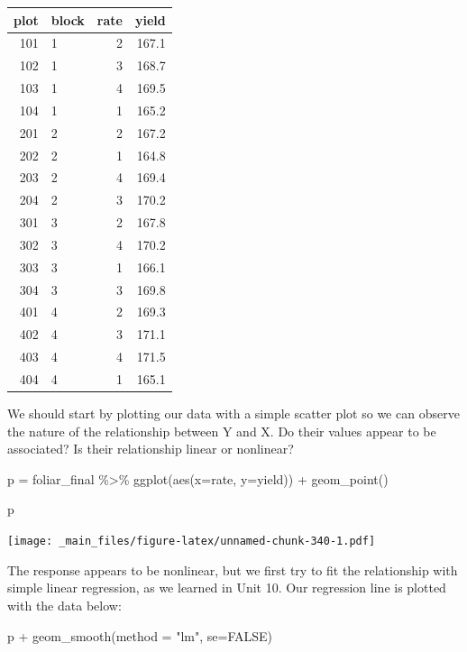 \documentclass[
]{book}
\newenvironment{Shaded}{\begin{snugshade}}{\end{snugshade}}
\newcommand{\AttributeTok}[1]{\textcolor[rgb]{0.77,0.63,0.00}{#1}}
\newcommand{\ConstantTok}[1]{\textcolor[rgb]{0.00,0.00,0.00}{#1}}
\newcommand{\FunctionTok}[1]{\textcolor[rgb]{0.00,0.00,0.00}{#1}}
\newcommand{\NormalTok}[1]{#1}
\newcommand{\OtherTok}[1]{\textcolor[rgb]{0.56,0.35,0.01}{#1}}
\newcommand{\SpecialCharTok}[1]{\textcolor[rgb]{0.00,0.00,0.00}{#1}}
\newcommand{\StringTok}[1]{\textcolor[rgb]{0.31,0.60,0.02}{#1}}
\begin{document}
\begin{tabular}[t]{r|l|r|r}
\hline
plot & block & rate & yield\\
\hline
101 & 1 & 2 & 167.1\\
\hline
102 & 1 & 3 & 168.7\\
\hline
103 & 1 & 4 & 169.5\\
\hline
104 & 1 & 1 & 165.2\\
\hline
201 & 2 & 2 & 167.2\\
\hline
202 & 2 & 1 & 164.8\\
\hline
203 & 2 & 4 & 169.4\\
\hline
204 & 2 & 3 & 170.2\\
\hline
301 & 3 & 2 & 167.8\\
\hline
302 & 3 & 4 & 170.2\\
\hline
303 & 3 & 1 & 166.1\\
\hline
304 & 3 & 3 & 169.8\\
\hline
401 & 4 & 2 & 169.3\\
\hline
402 & 4 & 3 & 171.1\\
\hline
403 & 4 & 4 & 171.5\\
\hline
404 & 4 & 1 & 165.1\\
\hline
\end{tabular}

We should start by plotting our data with a simple scatter plot so we can observe the nature of the relationship between Y and X. Do their values appear to be associated? Is their relationship linear or nonlinear?

\begin{Shaded}
\begin{Highlighting}[]
\NormalTok{p }\OtherTok{=}\NormalTok{ foliar\_final }\SpecialCharTok{\%\textgreater{}\%}
  \FunctionTok{ggplot}\NormalTok{(}\FunctionTok{aes}\NormalTok{(}\AttributeTok{x=}\NormalTok{rate, }\AttributeTok{y=}\NormalTok{yield)) }\SpecialCharTok{+}
  \FunctionTok{geom\_point}\NormalTok{()}

\NormalTok{p}
\end{Highlighting}
\end{Shaded}

\texttt{[image: \_main\_files/figure-latex/unnamed-chunk-340-1.pdf]}

The response appears to be nonlinear, but we first try to fit the relationship with simple linear regression, as we learned in Unit 10. Our regression line is plotted with the data below:

\begin{Shaded}
\begin{Highlighting}[]
\NormalTok{p }\SpecialCharTok{+} \FunctionTok{geom\_smooth}\NormalTok{(}\AttributeTok{method =} \StringTok{"lm"}\NormalTok{, }\AttributeTok{se=}\ConstantTok{FALSE}\NormalTok{)}
\end{Highlighting}
\end{Shaded}
\end{document}
